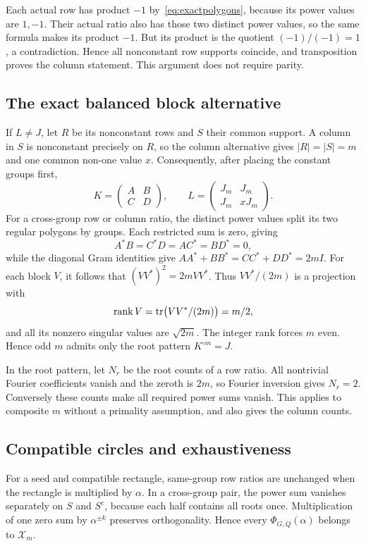Each actual row has product $-1$ by~\eqref{eq:exactpolygons}, because its power values are $1,-1$. Their actual ratio also has those two distinct power values, so the same formula makes its product $-1$. But its product is the quotient $(-1)/(-1)=1$, a contradiction. Hence all nonconstant row supports coincide, and transposition proves the column statement. This argument does not require parity.

\subsection{The exact balanced block alternative}
If $L\ne J$, let $R$ be its nonconstant rows and $S$ their common support. A column in $S$ is nonconstant precisely on $R$, so the column alternative gives $|R|=|S|=m$ and one common non-one value $x$. Consequently, after placing the constant groups first,
\[
 K=\begin{pmatrix}A&B\\C&D\end{pmatrix},\qquad
 L=\begin{pmatrix}J_m&J_m\\J_m&xJ_m\end{pmatrix}.
\]
For a cross-group row or column ratio, the distinct power values split its two regular polygons by groups. Each restricted sum is zero, giving
\[
 A^*B=C^*D=AC^*=BD^*=0,
\]
while the diagonal Gram identities give $AA^*+BB^*=CC^*+DD^*=2mI$. For each block $V$, it follows that $(VV^*)^2=2mVV^*$. Thus $VV^*/(2m)$ is a projection with
\[
 \operatorname{rank} V=\operatorname{tr}\bigl(VV^*/(2m)\bigr)=m/2,
\]
and all its nonzero singular values are $\sqrt{2m}$. The integer rank forces $m$ even. Hence odd $m$ admits only the root pattern $K^{\circ m}=J$.

In the root pattern, let $N_r$ be the root counts of a row ratio. All nontrivial Fourier coefficients vanish and the zeroth is $2m$, so Fourier inversion gives $N_r=2$. Conversely these counts make all required power sums vanish. This applies to composite $m$ without a primality assumption, and also gives the column counts.

\subsection{Compatible circles and exhaustiveness}
For a seed and compatible rectangle, same-group row ratios are unchanged when the rectangle is multiplied by $\alpha$. In a cross-group pair, the power sum vanishes separately on $S$ and $S^c$, because each half contains all roots once. Multiplication of one zero sum by $\alpha^{\pm k}$ preserves orthogonality. Hence every $\Phi_{G,Q}(\alpha)$ belongs to $\mathcal X_m$.

